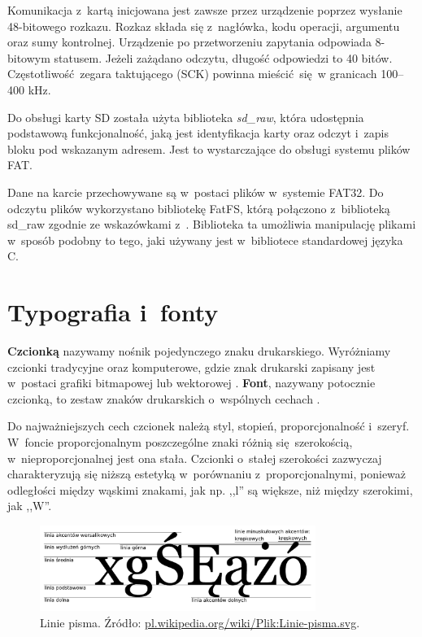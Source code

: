 Komunikacja z~kartą inicjowana jest zawsze przez urządzenie poprzez wysłanie \mbox{48-bitowego} rozkazu. Rozkaz składa się z~nagłówka, kodu operacji, argumentu oraz sumy kontrolnej. Urządzenie po przetworzeniu zapytania odpowiada \mbox{8-bitowym} statusem. Jeżeli zażądano odczytu, długość odpowiedzi to 40 bitów. Częstotliwość zegara taktującego (SCK) powinna mieścić się w granicach 100--400 kHz.

Do obsługi karty SD została użyta biblioteka \textit{sd\_raw}, która udostępnia podstawową funkcjonalność, jaką jest identyfikacja karty oraz odczyt i~zapis bloku pod wskazanym adresem. Jest to wystarczające do obsługi systemu plików FAT.

Dane na karcie przechowywane są w~postaci plików w~systemie FAT32. Do odczytu plików wykorzystano bibliotekę FatFS, którą połączono z~biblioteką sd\_raw zgodnie ze wskazówkami z~\cite{programowanie-avr}. Biblioteka ta umożliwia manipulację plikami w~sposób podobny to tego, jaki używany jest w~bibliotece standardowej języka C.

\section{Typografia i~fonty}

\textbf{Czcionką} nazywamy nośnik pojedynczego znaku drukarskiego. Wyróżniamy czcionki tradycyjne oraz komputerowe, gdzie znak drukarski zapisany jest w~postaci grafiki bitmapowej lub wektorowej \cite{fonts}. \textbf{Font}, nazywany potocznie czcionką, to zestaw znaków drukarskich o~wspólnych cechach \cite{fonts}.

Do najważniejszych cech czcionek należą styl, stopień, proporcjonalność i~szeryf. W~foncie proporcjonalnym poszczególne znaki różnią się szerokością, w~nieproporcjonalnej jest ona stała. Czcionki o~stałej szerokości zazwyczaj charakteryzują się niższą estetyką w~porównaniu z~proporcjonalnymi, ponieważ odległości między wąskimi znakami, jak np. ,,l'' są większe, niż między szerokimi, jak ,,W''.

\begin{figure}[t]
    \begin{center}
       \includegraphics[width=0.8\textwidth]{figures/linie-pisma.pdf}
    \end{center}

    \caption{Linie pisma. Źródło: \url{pl.wikipedia.org/wiki/Plik:Linie-pisma.svg}.}

    \label{linie-pisma}
\end{figure}


